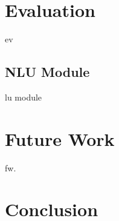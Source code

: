 \documentclass[11pt,a4paper]{article}
\begin{document}
\section{Evaluation}
	
	ev

\subsection{NLU Module}

	lu module
	

\section{Future Work}

	fw.
	

\section{Conclusion}
	
	



%

%


%
\end{document}
